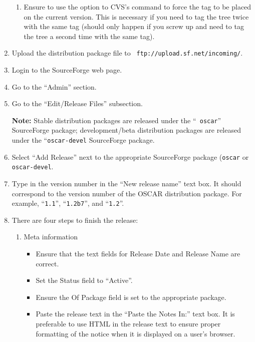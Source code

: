 \begin{enumerate}
\begin{enumerate}
  \item Ensure to use the  option to CVS's  command
    to force the tag to be placed on the current version.  This is
    necessary if you need to tag the tree twice with the same tag
    (should only happen if you screw up and need to tag the tree a
    second time with the same tag).
  \end{enumerate}

\item Upload the distribution package file to {\tt
    ftp://upload.sf.net/incoming/}.

\item Login to the SourceForge web page.

\item Go to the ``Admin'' section.

\item Go to the ``Edit/Release Files'' subsection.

{\bf Note:} Stable distribution packages are released under the ``{\tt
  oscar}'' SourceForge package; development/beta distribution packages
  are released under the ``{\tt oscar-devel} SourceForge package.

\item Select ``Add Release'' next to the appropriate SourceForge
  package ({\tt oscar} or {\tt oscar-devel}.

\item Type in the version number in the ``New release name'' text
  box.  It should correspond to the version number of the OSCAR
  distribution package.  For example, ``{\tt 1.1}'', ``{\tt 1.2b7}'',
  and ``{\tt 1.2}''.

\item There are four steps to finish the release:

  \begin{enumerate}

    \item Meta information
      \begin{itemize}
      \item Ensure that the text fields for Release Date and Release
        Name are correct.
        
      \item Set the Status field to ``Active''.
        
      \item Ensure the Of Package field is set to the appropriate
        package.
        
      \item Paste the release text in the ``Paste the Notes In:'' text
        box.  It is preferable to use HTML in the release text to
        ensure proper formatting of the notice when it is displayed on
        a user's browser.
        

\end{itemize}
\end{enumerate}
\end{enumerate}
